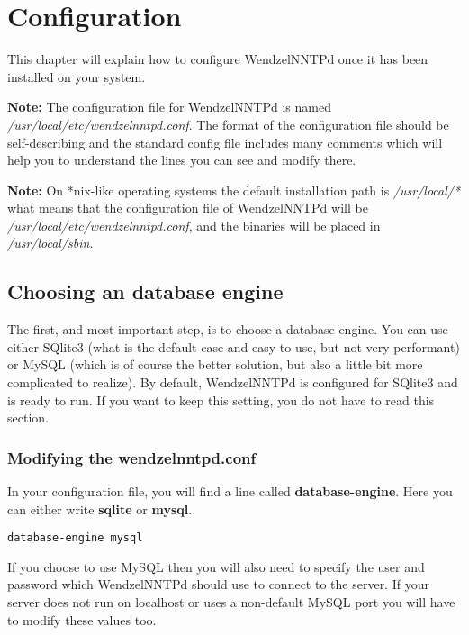 \chapter{Configuration}

This chapter will explain how to configure WendzelNNTPd once it has been installed on your system.

{\bf Note:} The configuration file for WendzelNNTPd is named {\it /usr/local/etc/wendzelnntpd.conf}. The format of the configuration file should be self-describing and the standard config file includes many comments which will help you to understand the lines you can see and modify there.

{\bf Note:} On *nix-like operating systems the default installation path is {\it /usr/local/*} what means that the configuration file of WendzelNNTPd will be {\it /usr/local/etc/wendzelnntpd.conf}, and the binaries will be placed in {\it /usr/local/sbin}. %

\section{Choosing an database engine}

The first, and most important step, is to choose a database engine. You can use either SQlite3 (what is the default case and easy to use, but not very performant) or MySQL (which is of course the better solution, but also a little bit more complicated to realize). By default, WendzelNNTPd is configured for SQlite3 and is ready to run. If you want to keep this setting, you do not have to read this section.

\subsection{Modifying the wendzelnntpd.conf}

In your configuration file, you will find a line called {\bf database-engine}. Here you can either write {\bf sqlite} or {\bf mysql}.

\begin{verbatim}
database-engine mysql
\end{verbatim}

If you choose to use MySQL then you will also need to specify the user and password which WendzelNNTPd should use to connect to the server. If your server does not run on localhost or uses a non-default MySQL port you will have to modify these values too.

